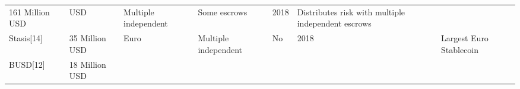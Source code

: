 \documentclass[english,]{IEEEtran}
\begin{document}
\begin{longtable}[]{@{}lllllll@{}}
\begin{minipage}[t]{0.08\columnwidth}
161 Million USD\strut
\end{minipage} & \begin{minipage}[t]{0.08\columnwidth}\raggedright\strut
USD\strut
\end{minipage} & \begin{minipage}[t]{0.10\columnwidth}\raggedright\strut
Multiple independent\strut
\end{minipage} & \begin{minipage}[t]{0.08\columnwidth}\raggedright\strut
Some escrows\strut
\end{minipage} & \begin{minipage}[t]{0.04\columnwidth}\raggedright\strut
2018\strut
\end{minipage} & \begin{minipage}[t]{0.30\columnwidth}\raggedright\strut
Distributes risk with multiple independent escrows\strut
\end{minipage}\tabularnewline
\begin{minipage}[t]{0.14\columnwidth}\raggedright\strut
Stasis{[}14{]}\strut
\end{minipage} & \begin{minipage}[t]{0.08\columnwidth}\raggedright\strut
35 Million USD\strut
\end{minipage} & \begin{minipage}[t]{0.08\columnwidth}\raggedright\strut
Euro\strut
\end{minipage} & \begin{minipage}[t]{0.10\columnwidth}\raggedright\strut
Multiple independent\strut
\end{minipage} & \begin{minipage}[t]{0.08\columnwidth}\raggedright\strut
No\strut
\end{minipage} & \begin{minipage}[t]{0.04\columnwidth}\raggedright\strut
2018\strut
\end{minipage} & \begin{minipage}[t]{0.30\columnwidth}\raggedright\strut
Largest Euro Stablecoin\strut
\end{minipage}\tabularnewline
\begin{minipage}[t]{0.14\columnwidth}\raggedright\strut
BUSD{[}12{]}\strut
\end{minipage} & \begin{minipage}[t]{0.08\columnwidth}\raggedright\strut
18 Million USD\strut
\end{minipage} & \begin{minipage}[t]{0.08\columnwidth}\raggedright\strut

\end{minipage}
\end{longtable}
\end{document}
